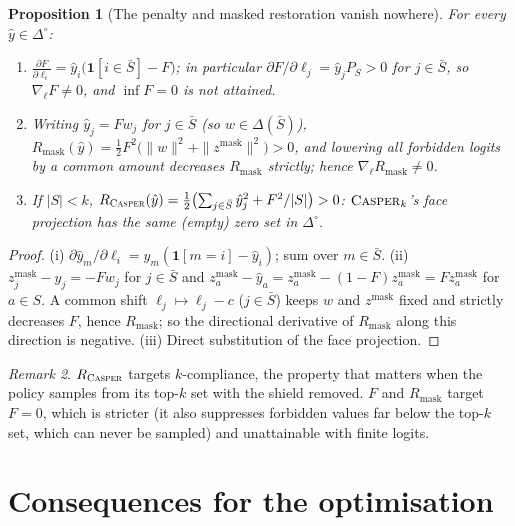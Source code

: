 \documentclass[11pt]{article}
\providecommand{\casper}{\textnormal{\textsc{Casper}}}
\newcommand{\yh}{\hat y}
\newcommand{\zm}{z^{\mathrm{mask}}}
\newcommand{\Sb}{\bar S}
\newcommand{\1}{\mathbf 1}
\newcommand{\Rc}{R_{\casper}}
\newcommand{\Rm}{R_{\mathrm{mask}}}
\newtheorem{proposition}{Proposition}
\theoremstyle{definition}
\theoremstyle{remark}
\newtheorem{remark}[proposition]{Remark}
\begin{document}
\begin{proposition}[The penalty and masked restoration vanish nowhere]\label{prop:never}
For every $\yh\in\Delta^\circ$:
\begin{enumerate}
\item[(i)] $\displaystyle\frac{\partial F}{\partial\ell_i}=\yh_i\bigl(\1[i\in\Sb]-F\bigr)$; in
particular $\partial F/\partial\ell_j=\yh_jP_S>0$ for $j\in\Sb$, so $\nabla_\ell F\neq0$, and
$\inf F=0$ is not attained.
\item[(ii)] Writing $\yh_j=F w_j$ for $j\in\Sb$ (so $w\in\Delta(\Sb)$),
$\Rm(\yh)=\tfrac12F^2\bigl(\|w\|^2+\|\zm\|^2\bigr)>0$, and lowering all forbidden logits by a common
amount decreases $\Rm$ strictly; hence $\nabla_\ell\Rm\neq0$.
\item[(iii)] If $|S|<k$, $\Rc(\yh)=\tfrac12\bigl(\sum_{j\in\Sb}\yh_j^2+F^2/|S|\bigr)>0$:
$\casper_k$'s face projection has the same (empty) zero set in $\Delta^\circ$.
\end{enumerate}
\end{proposition}
\begin{proof}
(i) $\partial\yh_m/\partial\ell_i=\yh_m(\1[m=i]-\yh_i)$; sum over $m\in\Sb$.
(ii) $\zm_j-\yh_j=-Fw_j$ for $j\in\Sb$ and $\zm_a-\yh_a=\zm_a-(1-F)\zm_a=F\zm_a$ for $a\in S$. A
common shift $\ell_j\mapsto\ell_j-c$ ($j\in\Sb$) keeps $w$ and $\zm$ fixed and strictly decreases
$F$, hence $\Rm$; so the directional derivative of $\Rm$ along this direction is negative.
(iii) Direct substitution of the face projection.
\end{proof}

\begin{remark}
$\Rc$ targets $k$-compliance, the property that matters when the policy samples from its top-$k$
set with the shield removed. $F$ and $\Rm$ target $F=0$, which is stricter (it also suppresses
forbidden values far below the top-$k$ set, which can never be sampled) and unattainable with finite
logits.
\end{remark}

\section{Consequences for the optimisation}
\end{document}

